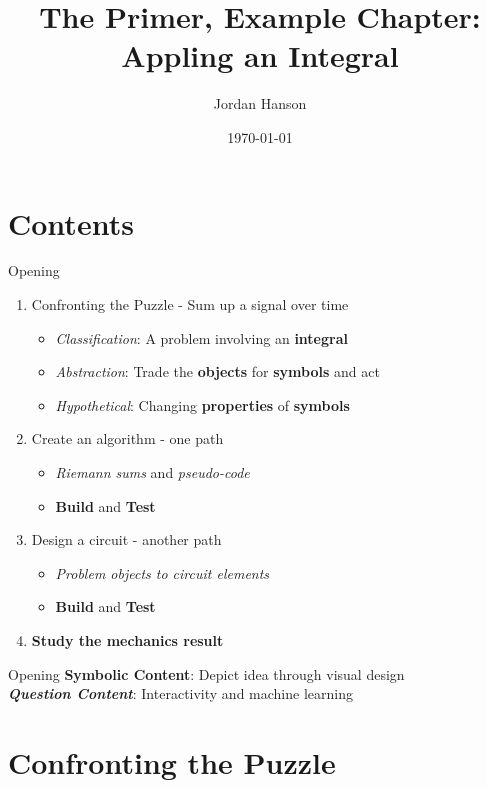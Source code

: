 \documentclass{beamer}
\title{The Primer, Example Chapter: Appling an Integral}
\date{\today}
\author{Jordan Hanson}
\institute{Whittier College Department of Physics and Astronomy}
\begin{document}
\maketitle

\section{Contents}

\begin{frame}{Opening}
\begin{enumerate}
\item Confronting the Puzzle - Sum up a signal over time
\begin{itemize}
\item \textit{\alert{Classification}}: A problem involving an \textbf{integral}
\item \textit{\alert{Abstraction}}: Trade the \textbf{objects} for \textbf{symbols} and act
\item \textit{\alert{Hypothetical}}: Changing \textbf{properties} of \textbf{symbols}
\end{itemize}
\item Create an algorithm - one path
\begin{itemize}
\item \textit{Riemann sums} and \textit{pseudo-code}
\item \textbf{Build} and \textbf{Test}
\end{itemize}
\item Design a circuit - another path
\begin{itemize}
\item \textit{Problem objects to circuit elements}
\item \textbf{Build} and \textbf{Test}
\end{itemize}
\item \textbf{\alert{Study the mechanics result}}
\end{enumerate}
\end{frame}

\begin{frame}{Opening}
\textbf{\alert{Symbolic Content}}: Depict idea through visual design \\
\textbf{\textit{Question Content}}: Interactivity and machine learning
\end{frame}

\section{Confronting the Puzzle}
\end{document}

